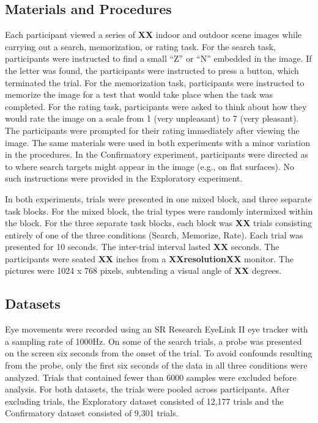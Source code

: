 \documentclass[
  english,
  man,floatsintext]{apa6}
\begin{document}
\subsection{Materials and Procedures}

Each participant viewed a series of \textbf{XX} indoor and outdoor scene images while carrying out a search, memorization, or rating task. For the search task, participants were instructed to find a small \enquote{Z} or \enquote{N} embedded in the image. If the letter was found, the participants were instructed to press a button, which terminated the trial. For the memorization task, participants were instructed to memorize the image for a test that would take place when the task was completed. For the rating task, participants were asked to think about how they would rate the image on a scale from 1 (very unpleasant) to 7 (very pleasant). The participants were prompted for their rating immediately after viewing the image. The same materials were used in both experiments with a minor variation in the procedures. In the Confirmatory experiment, participants were directed as to where search targets might appear in the image (e.g., on flat surfaces). No such instructions were provided in the Exploratory experiment.

In both experiments, trials were presented in one mixed block, and three separate task blocks. For the mixed block, the trial types were randomly intermixed within the block. For the three separate task blocks, each block was \textbf{XX} trials consisting entirely of one of the three conditions (Search, Memorize, Rate). Each trial was presented for 10 seconds. The inter-trial interval lasted \textbf{XX} seconds. The participants were seated \textbf{XX} inches from a \textbf{XXresolutionXX} monitor. The pictures were 1024 x 768 pixels, subtending a visual angle of \textbf{XX} degrees.

\subsection{Datasets}

Eye movements were recorded using an SR Research EyeLink II eye tracker with a sampling rate of 1000Hz. On some of the search trials, a probe was presented on the screen six seconds from the onset of the trial. To avoid confounds resulting from the probe, only the first six seconds of the data in all three conditions were analyzed. Trials that contained fewer than 6000 samples were excluded before analysis. For both datasets, the trials were pooled across participants. After excluding trials, the Exploratory dataset consisted of 12,177 trials and the Confirmatory dataset consisted of 9,301 trials.
\end{document}
